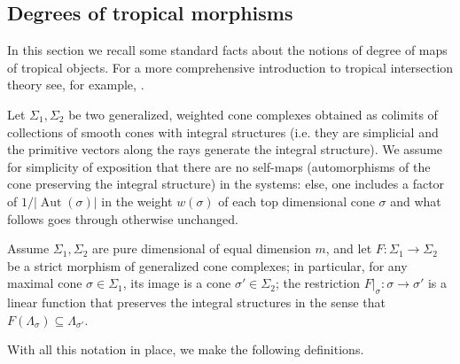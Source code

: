 \documentclass[11pt,reqno]{amsart}
\theoremstyle{definition}
\DeclareMathOperator{\Aut}{\mathrm Aut}
\begin{document}
\subsection{Degrees of tropical morphisms} In this section we recall some standard facts about the notions of degree of maps of tropical objects. For a more comprehensive introduction to tropical intersection theory see, for example, \cite[Section 6.7]{macstu:tropgeom}.

Let $\Sigma_1, \Sigma_2$ be two generalized, weighted cone complexes obtained as colimits of  collections of smooth cones with integral structures (i.e. they are simplicial and the primitive vectors along the rays generate the integral structure). We assume for simplicity of exposition that there are no self-maps (automorphisms of the cone preserving the integral structure) in the systems: else, one  includes a factor of $1/|\Aut(\sigma)|$ in the weight $w(\sigma)$ of each top dimensional cone $\sigma$ and what follows goes through otherwise unchanged. 

Assume $\Sigma_1, \Sigma_2$ are pure dimensional of equal dimension $m$, and let $F:\Sigma_1\to \Sigma _2$ be a strict morphism of generalized cone complexes; in particular, for any maximal cone $\sigma\in \Sigma_1$, its image is a cone $\sigma'\in \Sigma_2$; the restriction
$F|_{\sigma}: \sigma \to \sigma'$ is a linear function that preserves the integral structures in the sense that $F(\Lambda_\sigma)\subseteq \Lambda_{\sigma'}$.

With all this notation in place, we make the following definitions.
\end{document}
